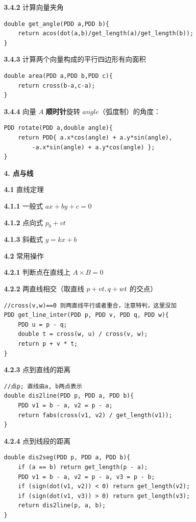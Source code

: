 \documentclass[12pt]{article}
\begin{document}
\textbf{3.4.2} 计算向量夹角

\begin{lstlisting}[style=C++]
double get_angle(PDD a,PDD b){
	return acos(dot(a,b)/get_length(a)/get_length(b));
}
\end{lstlisting}

\textbf{3.4.3} 计算两个向量构成的平行四边形有向面积

\begin{lstlisting}[style=C++]
double area(PDD a,PDD b,PDD c){
	return cross(b-a,c-a);
}
\end{lstlisting}

\textbf{3.4.4} 向量 $A$ \textbf{顺时针}旋转 $angle$（弧度制）的角度：

\begin{lstlisting}[style=C++]
PDD rotate(PDD a,double angle){
	return PDD{ a.x*cos(angle) + a.y*sin(angle),
		-a.x*sin(angle) + a.y*cos(angle) };
}
\end{lstlisting}

\textbf{4. 点与线}

\textbf{4.1} 直线定理

\textbf{4.1.1} 一般式 $ax+by+c=0$

\textbf{4.1.2} 点向式 $p_0+vt$

\textbf{4.1.3} 斜截式 $y=kx+b$

\textbf{4.2} 常用操作

\textbf{4.2.1} 判断点在直线上 $A\times B=0$

\textbf{4.2.2} 两直线相交（取直线 $p+vt,\space q+wt$ 的交点）

\begin{lstlisting}[style=C++]
//cross(v,w)==0 则两直线平行或者重合，注意特判，这里没加
PDD get_line_inter(PDD p, PDD v, PDD q, PDD w){
	PDD u = p - q;
	double t = cross(w, u) / cross(v, w);
	return p + v * t;
}
\end{lstlisting}

\textbf{4.2.3} 点到直线的距离

\begin{lstlisting}[style=C++]
//点p; 直线由a, b两点表示
double dis2line(PDD p, PDD a, PDD b){
	PDD v1 = b - a, v2 = p - a;
	return fabs(cross(v1, v2) / get_length(v1));
}
\end{lstlisting}

\textbf{4.2.4} 点到线段的距离

\begin{lstlisting}[style=C++]
double dis2seg(PDD p, PDD a, PDD b){
	if (a == b) return get_length(p - a);
	PDD v1 = b - a, v2 = p - a, v3 = p - b;
	if (sign(dot(v1, v2)) < 0) return get_length(v2);
	if (sign(dot(v1, v3)) > 0) return get_length(v3);
	return dis2line(p, a, b);
}
\end{lstlisting}
\end{document}
